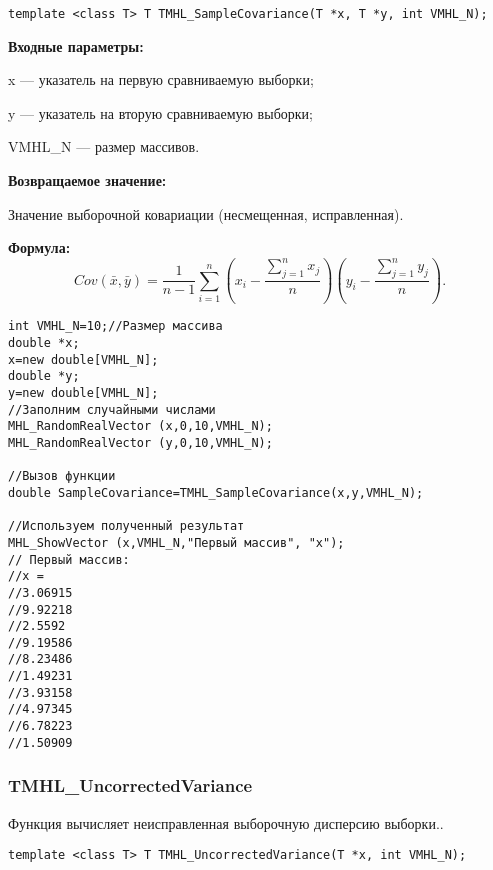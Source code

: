 \documentclass[a4paper,12pt]{article}
\begin{document}
\begin{lstlisting}[label=code_syntax_TMHL_SampleCovariance,caption=Синтаксис]
template <class T> T TMHL_SampleCovariance(T *x, T *y, int VMHL_N);
\end{lstlisting}

\textbf{Входные параметры:}
 
x --- указатель на первую сравниваемую выборки;
 
y --- указатель на вторую сравниваемую выборки;
 
VMHL\_N --- размер массивов.

\textbf{Возвращаемое значение:}
 
Значение выборочной ковариации (несмещенная, исправленная).

\textbf{Формула:}
\begin{equation*}
Cov\left(\bar{x},\bar{y} \right)= \dfrac{1}{n-1}\sum_{i=1}^{n} \left( x_i-\dfrac{\sum_{j=1}^{n}x_j}{n}\right)\left( y_i-\dfrac{\sum_{j=1}^{n}y_j}{n}\right) .
\end{equation*}



\begin{lstlisting}[label=code_use_TMHL_SampleCovariance,caption=Пример использования]
int VMHL_N=10;//Размер массива
double *x;
x=new double[VMHL_N];
double *y;
y=new double[VMHL_N];
//Заполним случайными числами
MHL_RandomRealVector (x,0,10,VMHL_N);
MHL_RandomRealVector (y,0,10,VMHL_N);

//Вызов функции
double SampleCovariance=TMHL_SampleCovariance(x,y,VMHL_N);

//Используем полученный результат
MHL_ShowVector (x,VMHL_N,"Первый массив", "x");
// Первый массив:
//x =
//3.06915
//9.92218
//2.5592
//9.19586
//8.23486
//1.49231
//3.93158
//4.97345
//6.78223
//1.50909
\end{lstlisting}

\subsubsection{TMHL\_UncorrectedVariance}\label{TMHL_UncorrectedVariance}

Функция вычисляет неисправленная выборочную дисперсию выборки..


\begin{lstlisting}[label=code_syntax_TMHL_UncorrectedVariance,caption=Синтаксис]
template <class T> T TMHL_UncorrectedVariance(T *x, int VMHL_N);
\end{lstlisting}
\end{document}
